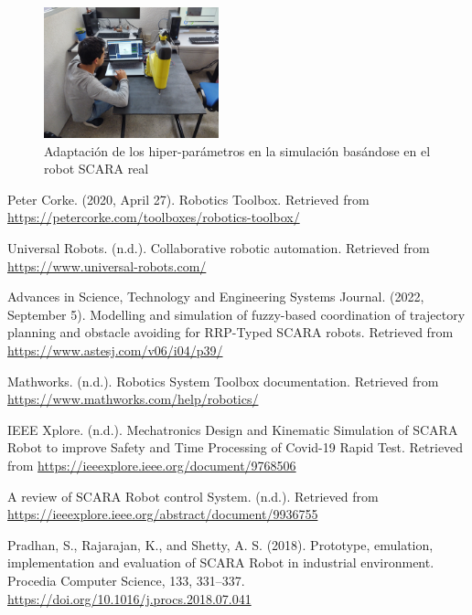 \documentclass[final]{foresj}
\begin{document}
\begin{figure}[h!]
\centering
\includegraphics[width=0.45\textwidth]{SCARA7.jpg}
\caption{Adaptación de los hiper-parámetros en la simulación basándose en el robot SCARA real}
\label{fig:my_label}
\end{figure}

\begin{thebibliography}{9}

Peter Corke. (2020, April 27). Robotics Toolbox. Retrieved from \url{https://petercorke.com/toolboxes/robotics-toolbox/}

Universal Robots. (n.d.). Collaborative robotic automation. Retrieved from \url{https://www.universal-robots.com/}

Advances in Science, Technology and Engineering Systems Journal. (2022, September 5). Modelling and simulation of fuzzy-based coordination of trajectory planning and obstacle avoiding for RRP-Typed SCARA robots. Retrieved from \url{https://www.astesj.com/v06/i04/p39/}

Mathworks. (n.d.). Robotics System Toolbox documentation. Retrieved from \url{https://www.mathworks.com/help/robotics/}

IEEE Xplore. (n.d.). Mechatronics Design and Kinematic Simulation of SCARA Robot to improve Safety and Time Processing of Covid-19 Rapid Test. Retrieved from \url{https://ieeexplore.ieee.org/document/9768506}

A review of SCARA Robot control System. (n.d.). Retrieved from \url{https://ieeexplore.ieee.org/abstract/document/9936755}

Pradhan, S., Rajarajan, K., and Shetty, A. S. (2018). Prototype, emulation, implementation and evaluation of SCARA Robot in industrial environment. Procedia Computer Science, 133, 331–337. \url{https://doi.org/10.1016/j.procs.2018.07.041}


\end{thebibliography}
\end{document}
